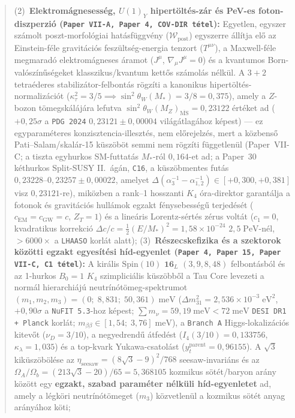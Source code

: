 \documentclass[11pt,a4paper]{article}
\begin{document}
\begin{abstract}
(2)~\textbf{Elektromágnesesség, $U(1)_Y$ hipertöltés-zár és PeV-es foton-diszperzió (\texttt{Paper VII-A, Paper 4, COV-DIR tétel}):} Egyetlen, egyszer számolt poszt-morfológiai hatásfüggvény ($\mathcal{W}_{\mathrm{post}}$) egyszerre állítja elő az Einstein-féle gravitációs feszültség-energia tenzort ($T^{\mu\nu}$), a Maxwell-féle megmaradó elektromágneses áramot ($J^\mu$, $\nabla_\mu J^\mu=0$) és a kvantumos Born-valószínűségeket klasszikus/kvantum kettős számolás nélkül. A $3+2$ tetraéderes stabilizátor-felbontás rögzíti a kanonikus hipertöltés-normalizációt ($\kappa_\tau^2=3/5\implies\sin^2\theta_W(M_*)=3/8=0{,}375$), amely a $Z$-bozon tömegskálájára lefutva $\sin^2\theta_W(M_Z)_{\overline{\mathrm{MS}}}=0{,}23122$ értéket ad ($+0{,}25\sigma$ a \texttt{PDG 2024} $0{,}23121\pm 0{,}00004$ világátlagához képest) --- ez egyparam\'eteres konzisztencia-illeszt\'es, nem el\H{o}rejelz\'es, mert a k\"ozbens\H{o} Pati--Salam/\allowbreak skal\'ar-15 k\"usz\"ob\"ot semmi nem r\"ogz\'iti f\"uggetlen\"ul (Paper~VII-C; a tiszta egyhurkos SM-futtat\'as $M_*$-r\'ol $0{,}164$-et ad; a Paper~30 k\'ethurkos Split-SUSY II.~\'ag\'an, \texttt{C16}, a k\"usz\"obmentes fut\'as $0{,}23228\text{--}0{,}23257\pm 0{,}00022$, amelyet $\Delta(\alpha_3^{-1}-\alpha_{1,2}^{-1})\in[+0{,}300,+0{,}381]$ visz $0{,}23121$-re), miközben a rank--1 hosszanti $K_4$ óra-direktor garantálja a fotonok és gravitációs hullámok egzakt fénysebességű terjedését ($c_{\mathrm{EM}}=c_{\mathrm{GW}}=c$, $Z_T=1$) és a lineáris Lorentz-sértés zérus voltát ($c_1=0$, kvadratikus korrekció $\Delta c/c=\frac{1}{2}(E/M_*)^2=1{,}58\times 10^{-24}$ $2{,}5\;\mathrm{PeV}$-nél, $>6000\times$ a \texttt{LHAASO} korlát alatt);
(3)~\textbf{Részecskefizika és a szektorok közötti egzakt egyesítési híd-egyenlet (\texttt{Paper 4, Paper 15, Paper VII-C, C1 tétel}):} A királis $\mathrm{Spin}(10)$ $\mathbf{16}_L$ $(3,9,8,48)$ felbontásból és az 1-hurkos $B_0=1$ $K_4$ szimpliciális küszöbből a Tau Core levezeti a normál hierarchiájú neutrínótömeg-spektrumot $(m_1,m_2,m_3)=(0;\;8{,}831;\;50{,}361)\;\mathrm{meV}$ ($\Delta m_{31}^2=2{,}536\times 10^{-3}\;\mathrm{eV}^2$, $+0{,}90\sigma$ a \texttt{NuFIT 5.3}-hoz képest; $\sum m_\nu=59{,}19\;\mathrm{meV}<72\;\mathrm{meV}$ \texttt{DESI DR1 + Planck} korlát; $m_{\beta\beta}\in[1{,}54;\;3{,}76]\;\mathrm{meV}$), a \texttt{Branch A} Higgs-lokalizációs kitevőt ($\nu_D=3/10$), a negyedrendű átfedést ($I_4(3/10)=0{,}133756$, $\kappa_\lambda=1{,}035$) és a top-kvark Yukawa-csatolást ($y_t^{\mathrm{parent}}=0{,}96155$). A $\sqrt{3}$ kiküszöbölése az $\eta_{\mathrm{seesaw}}=(8\sqrt{3}-9)^2/768$ seesaw-invariáns és az $\Omega_A/\Omega_b=(213\sqrt{3}-20)/65=5{,}368105$ kozmikus sötét/baryon arány között egy \textbf{egzakt, szabad paraméter nélküli híd-egyenletet} ad, amely a légköri neutrínótömeget ($m_3$) közvetlenül a kozmikus sötét anyag arányához köti;

\end{abstract}
\end{document}

